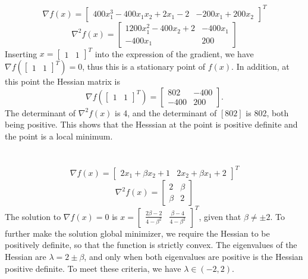 \documentclass[11pt]{article}
\begin{document}
\section{}
$$\nabla f(x)=\begin{bmatrix} 400x_1^3-400x_1x_2+2x_1-2 & -200x_1+200x_2\end{bmatrix}^T$$
$$\nabla ^2f(x)=\begin{bmatrix} 1200x_1^2-400x_2+2 & -400x_1\\ -400x_1 &200\end{bmatrix} $$
Inserting $x=\begin{bmatrix} 1 & 1\end{bmatrix}^T $ into the expression of the gradient, we have $\nabla f(\begin{bmatrix} 1&1\end{bmatrix}^T )=0$, thus this is a stationary point of $f(x)$. In addition, at this point the Hessian matrix is $$\nabla f(\begin{bmatrix} 1 & 1\end{bmatrix}^T ) = \begin{bmatrix} 802 & -400 \\ -400 & 200\end{bmatrix} .$$ The determinant of $\nabla ^2f(x)$ is 4, and the determinant of $[802]$ is 802, both being positive. This shows that the Hesssian at the point is positive definite and the point is a local minimum. 
\section{}
$$\nabla f(x)=\begin{bmatrix}2x_1+\beta x_2 +1& 2x_2+\beta x_1+2\end{bmatrix}^T$$ $$\nabla^2f(x)=\begin{bmatrix}2 & \beta \\ \beta & 2 \end{bmatrix}$$
The solution to $\nabla f(x)=0$ is $x=\begin{bmatrix} \frac{2\beta-2}{4-\beta^2} & \frac{\beta-4}{4-\beta^2} \end{bmatrix}^T$, given that $\beta\neq\pm2$. To further make the solution global minimizer, we require the Hessian to be positively definite, so that the function is strictly convex. The eigenvalues of the Hessian are $\lambda=2\pm\beta$, and only when both eigenvalues are positive is the Hessian positive definite. To meet these criteria, we have $\lambda\in(-2,2)$.
\end{document}
